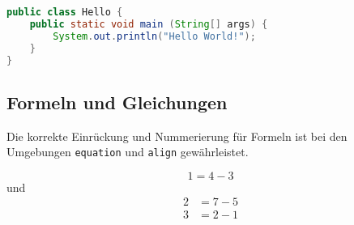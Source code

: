 \documentclass[utf8,biblatex]{lni}
\begin{document}
    \begin{lstlisting}[caption={Beschreibung}, label=L1, language=Java]
public class Hello {
    public static void main (String[] args) {
        System.out.println("Hello World!");
    }
}
    \end{lstlisting}

    \subsection{Formeln und Gleichungen}

    Die korrekte Einrückung und Nummerierung für Formeln ist bei den Umgebungen
    \texttt{equation} und \texttt{align} gewährleistet.

    \begin{equation}
        1=4-3
    \end{equation}
    und
    \begin{align}
        2&=7-5\\
        3&=2-1
    \end{align}

    \printbibliography
\end{document}
